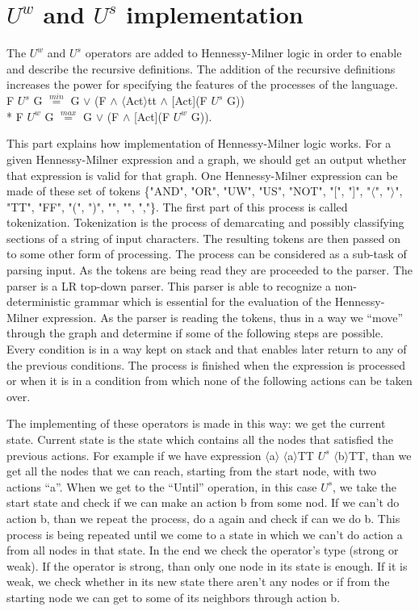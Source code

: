 \section{$U^w$ and $U^s$ implementation}
The $U^w$  and $U^s$ operators are added to Hennessy-Milner logic in order to enable and describe the recursive definitions. The addition of the recursive definitions increases the power for specifying the features of the processes of the language.
\\
F $U^s$ G $\stackrel{min}{=}$ G $\vee$ (F $\wedge$ $\langle$Act$\rangle$tt $\wedge$ [Act](F $U^s$ G))\\*
F $U^w$ G $\stackrel{max}{=}$ G $\vee$ (F $\wedge$ [Act](F $U^w$ G)).

This part explains how implementation of Hennessy-Milner logic works. For a given Hennessy-Milner expression and a graph, we should get an output whether that expression is valid for that graph.  One Hennessy-Milner expression can be made of these set of tokens \{"AND", "OR", "UW", "US", "NOT", "[", "]", "$\langle$", "$\rangle$", "TT", "FF", "(", ")", "{", "}", ","\}.  The first part of this process is called tokenization. Tokenization is the process of demarcating and possibly classifying sections of a string of input characters. The resulting tokens are then passed on to some other form of processing.
The process can be considered as a sub-task of parsing input. As the tokens are being read they are proceeded to the parser. The parser is a LR top-down parser. This parser is able to recognize a non-deterministic grammar which is essential for the evaluation of the Hennessy-Milner expression. As the parser is reading the tokens, thus in a way we “move” through the graph and determine if some of the following steps are possible. Every condition is in a way kept on stack and that enables later return to any of the previous conditions. The process is finished when the expression  is processed or when it is in a condition from which none of the following actions can be taken over.

The implementing of these operators is made in this way: we get the current state. Current state is the state which contains all the nodes that satisfied the previous actions. For example if we have expression $\langle$a$\rangle$ $\langle$a$\rangle$TT $U^s$ $\langle$b$\rangle$TT, than we get all the nodes that we can reach, starting from the start node, with two actions “a”. When we get to the “Until” operation, in this case $U^s$, we take the start state and check if we can make an action b from some nod. If we can’t do action b, than we repeat the process, do a again and check if can we do b. This process is being repeated until we come to a state in which we can't do action a from all nodes in that state.
In the end we check the operator’s type (strong or weak). If the operator is strong, than only one node in its state is enough. If it is weak, we check whether in its new state there aren’t any nodes or if from the starting node we can get to some of its neighbors through action b. \\

